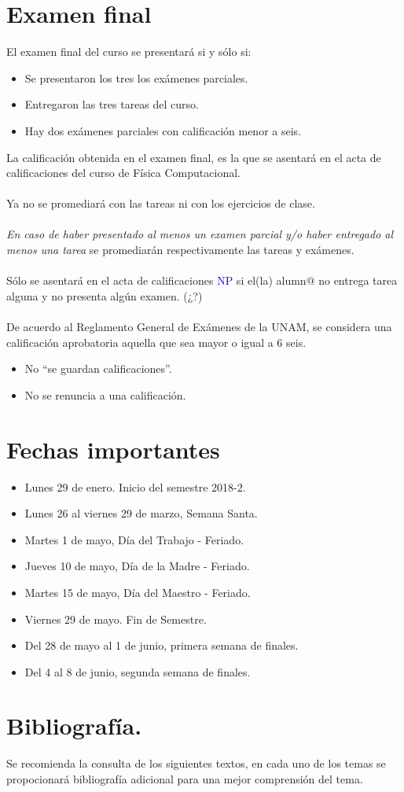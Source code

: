 \documentclass[12pt]{article}
\begin{document}
\section{Examen final}
El examen final del curso se presentará si y sólo si:
\begin{itemize}
\item Se presentaron los tres los exámenes parciales.
\item Entregaron las tres tareas del curso.
\item Hay dos exámenes parciales con calificación menor a seis.
\end{itemize}
La calificación obtenida en el examen final, es la que se asentará en el acta de calificaciones del curso de Física Computacional.
\\
\\
Ya no se promediará con las tareas ni con los ejercicios de clase.\\
\\
\emph{En caso de haber presentado al menos un examen parcial y/o haber entregado al menos una tarea} se promediarán respectivamente las tareas y exámenes.
\\
\\
Sólo se asentará en el acta de calificaciones \textcolor{blue}{NP} si el(la) alumn{@} no entrega tarea alguna y no presenta algún examen. (¿?)
\\
\\
De acuerdo al Reglamento General de Exámenes de la UNAM, se considera una calificación aprobatoria aquella que sea mayor o igual a $6$ seis.
\begin{itemize}
\item No \enquote{se guardan calificaciones}.
\item No se renuncia a una calificación.
\end{itemize}
\section{Fechas importantes}
\begin{itemize}
\item Lunes 29 de enero. Inicio del semestre 2018-2.
\item Lunes 26 al viernes 29 de marzo, Semana Santa.
\item Martes 1 de mayo, Día del Trabajo - Feriado.
\item Jueves 10 de mayo, Día de la Madre - Feriado.
\item Martes 15 de mayo, Día del Maestro - Feriado.
\item Viernes 29 de mayo. Fin de Semestre.
\item Del 28 de mayo al 1 de junio, primera semana de finales.
\item Del 4 al 8 de junio, segunda semana de finales.
\end{itemize}
\newpage
\section{Bibliografía.}
Se recomienda la consulta de los siguientes textos, en cada uno de los temas se propocionará bibliografía adicional para una mejor comprensión del tema.
\nocite{*}


\end{document}
